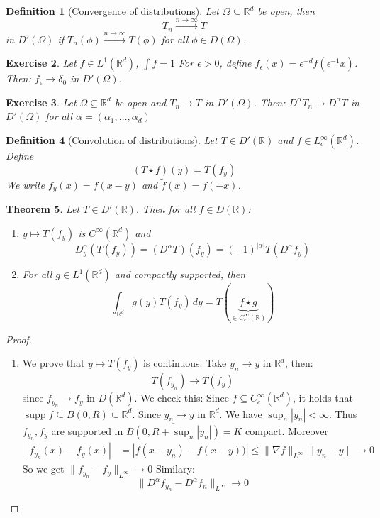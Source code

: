 \documentclass{report}
\theoremstyle{tommy}
\newtheorem{defn}{Definition}
\newtheorem{thm}[defn]{Theorem}
\newtheorem{ex}[defn]{Exercise}
\newcommand{\supp}{\operatorname{supp}}
\begin{document}
  \begin{defn}[Convergence of distributions]
    Let \(\Omega \subseteq \mathbb{R}^d\) be open, then
    \[T_n \xrightarrow{n \to \infty} T\] in \(D'(\Omega)\) if \(T_n(\phi) \xrightarrow{n \to \infty} T(\phi)\) for all \(\phi \in D(\Omega)\).
  \end{defn}

  \begin{ex}
    Let \(f \in L^1(\mathbb{R}^d)\), \(\int f = 1\) For \(\epsilon > 0\), define \(f_\epsilon(x) = \epsilon^{-d}f(\epsilon^{-1} x)\). Then: \(f_\epsilon \to \delta_0\) in \(D'(\Omega)\).
  \end{ex}
  
  \begin{ex}
    Let \(\Omega \subseteq \mathbb{R}^d\) be open and \(T_n \to T\) in \(D'(\Omega)\). Then:
    \(D^\alpha T_n \to D^\alpha T\) in \(D'(\Omega)\) for all \(\alpha = (\alpha_1, \dots, \alpha_d)\)
  \end{ex}
  
  \begin{defn}[Convolution of distributions]
    Let \(T \in D'(\mathbb{R})\) and \(f \in L_c^\infty(\mathbb{R}^d)\). Define \[(T \star f)(y) = T(f_y)\]
    We write \(f_y(x) = f(x-y)\) and \(\tilde f(x) = f(-x)\).
  \end{defn}
  
  \begin{thm}
    Let \(T \in D'(\mathbb{R})\). Then for all \(f \in D(\mathbb{R})\):
    \begin{enumerate}
      \item \(y \mapsto T(f_y)\) is \(C^\infty(\mathbb{R}^d)\) and 
      \[D_y^\alpha(T(f_y)) = (D^\alpha T)(f_y) = (-1)^{|\alpha|}T(D^\alpha f_y)\]
      \item For all \(g \in L^1(\mathbb{R}^d)\) and compactly supported, then
      \[\int_{\mathbb{R}^d} g(y) T(f_y) \, dy = T(\underbrace{f \star g}_{\in C_c^\infty(\mathbb{R})})\]
    \end{enumerate}
  \end{thm}

  \begin{proof}
    \begin{enumerate}
      \item We prove that \(y \mapsto T(f_y)\) is continuous. Take \(y_n \to y\) in \(\mathbb{R}^d\), then:\[T(f_{y_n}) \to T(f_y)\] since \(f_{y_n} \to f_y\) in \(D(\mathbb{R}^d)\). We check this: Since \(f \subseteq C_c^\infty(\mathbb{R}^d)\), it holds that \(\supp f \subseteq B(0, R) \subseteq \mathbb{R}^d\). Since \(y_n \to y\) in \(\mathbb{R}^d\). We have \(\sup_n |y_n| < \infty\). Thus \(f_{y_n}, f_y\) are supported in \(\overline{B(0, R + \sup_n |y_n|)} = K\) compact. Moreover
      \begin{align*}
        |f_{y_n}(x) - f_y(x)|
        &= |f(x-y_n) - f(x-y))|
        \le \| \nabla f \|_{L^\infty} \|y_n - y\| \to 0
      \end{align*}
      So we get \(\| f_{y_n} - f_y\|_{L^\infty} \to 0\)
      Similary:
      \[\|D^\alpha f_{y_n} - D^\alpha f_n \|_{L^\infty} \to 0\] \qedhere
    \end{enumerate}
  \end{proof}
\end{document}
